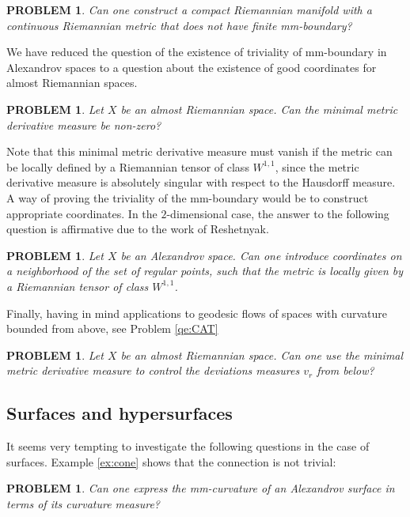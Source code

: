 \documentclass[12pt,leqno,intlimits]{amsart}
\numberwithin{equation}{section}
\newtheorem{quest}[thm]{PROBLEM}
\theoremstyle{definition}
\theoremstyle{remark}
\begin{document}
\begin{quest}
 Can one construct a compact Riemannian manifold with a continuous Riemannian metric
that does not have finite mm-boundary?
\end{quest}


We have reduced the question of the existence of triviality of mm-boundary in Alexandrov spaces to a question
about the existence of good coordinates for almost Riemannian spaces.   

\begin{quest}
Let $X$ be an almost Riemannian space. Can  the minimal metric derivative measure be non-zero?
\end{quest}

Note that this minimal metric derivative measure must vanish if the metric can be locally defined  by a Riemannian
tensor of class $W^{1,1}$, since the metric derivative measure is absolutely singular with respect to the Hausdorff measure.
A way of proving the triviality of the mm-boundary would be to construct appropriate coordinates. In the $2$-dimensional case, the answer to the following question is affirmative due to the work of Reshetnyak.

\begin{quest}
Let $X$ be an Alexandrov space. Can one introduce coordinates on a neighborhood of the set of regular points, such that the metric is locally given by a Riemannian tensor of class $W^{1,1}$.
\end{quest}


Finally, having in mind applications to geodesic flows of spaces with curvature bounded from above, see Problem \ref{qe:CAT}

\begin{quest}  \label{qe:BV}
Let $X$ be an  almost Riemannian space. Can one use the minimal metric derivative measure to control the deviations measures $v_r$ from below?
\end{quest} 

\subsection{Surfaces and  hypersurfaces}
It seems very tempting to investigate the following questions in the case of surfaces.  Example \ref{ex:cone} shows that the connection is not trivial:


\begin{quest}
Can one express the mm-curvature of an Alexandrov  surface in terms of its curvature measure?
\end{quest}
\end{document}
